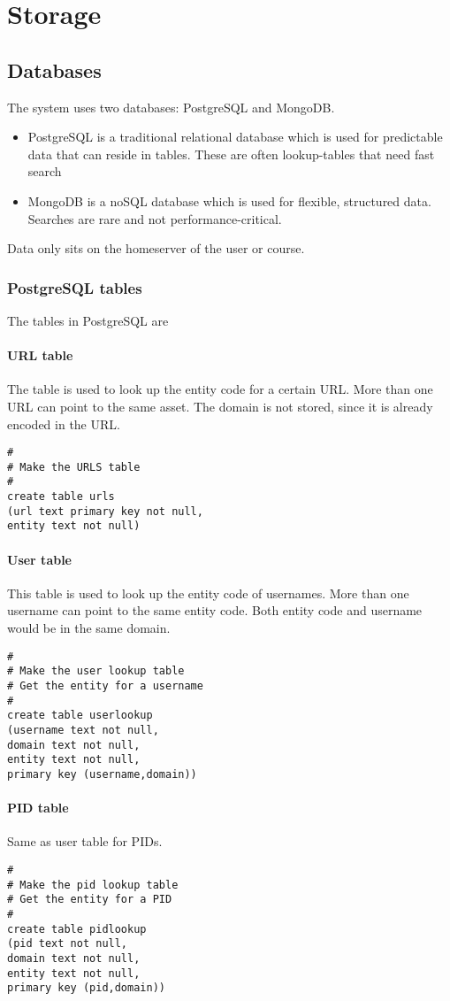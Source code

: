 \chapter{Storage}
\section{Databases}
The system uses two databases: PostgreSQL and MongoDB.
\begin{itemize}
\item PostgreSQL is a traditional relational database which is used for predictable data that can reside in tables. These are often lookup-tables that need fast search
\item MongoDB is a noSQL database which is used for flexible, structured data. Searches are rare and not performance-critical.
\end{itemize}
Data only sits on the homeserver of the user or course.
\subsection{PostgreSQL tables}
The tables in PostgreSQL are
\subsubsection{URL table}
The table is used to look up the entity code for a certain URL. More than one URL can point to the same asset. The domain is not stored, since it is already encoded in the URL.
\begin{verbatim}
#
# Make the URLS table
#
create table urls
(url text primary key not null,
entity text not null)
\end{verbatim}

\subsubsection{User table}
This table is used to look up the entity code of usernames. More than one username can point to the same entity code. Both entity code and username would be in the same domain.
\begin{verbatim}
#
# Make the user lookup table
# Get the entity for a username
#
create table userlookup
(username text not null,
domain text not null,
entity text not null,
primary key (username,domain))
\end{verbatim}

\subsubsection{PID table}
Same as user table for PIDs.
\begin{verbatim}
#
# Make the pid lookup table
# Get the entity for a PID
#
create table pidlookup
(pid text not null,
domain text not null,
entity text not null,
primary key (pid,domain))
\end{verbatim}
